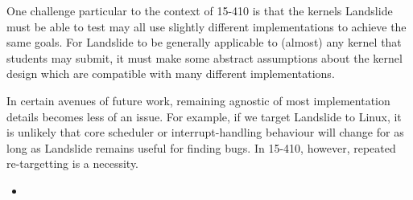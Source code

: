 One challenge particular to the context of 15-410 is that the kernels Landslide must be able to test may all use slightly different implementations to achieve the same goals. For Landslide to be generally applicable to (almost) any kernel that students may submit, it must make some abstract assumptions about the kernel design which are compatible with many different implementations.

In certain avenues of future work, remaining agnostic of most implementation details becomes less of an issue. For example, if we target Landslide to Linux, it is unlikely that core scheduler or interrupt-handling behaviour will change for as long as Landslide remains useful for finding bugs. In 15-410, however, repeated re-targetting is a necessity.

\begin{itemize}
	\item
\end{itemize}

